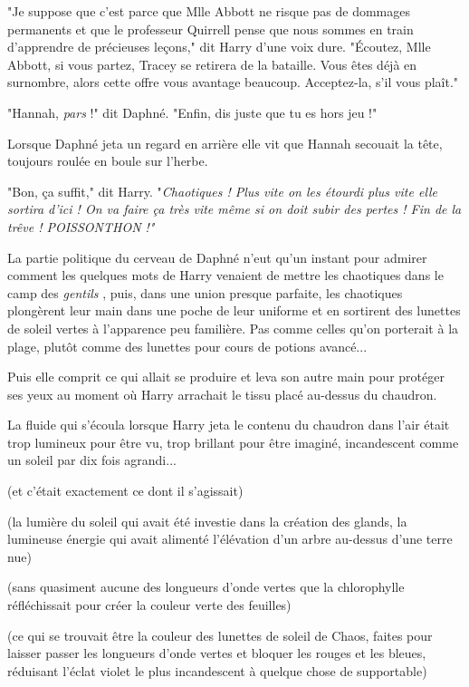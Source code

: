 "Je suppose que c'est parce que Mlle Abbott ne risque pas de dommages permanents et que le professeur Quirrell pense que nous sommes en train d'apprendre de précieuses leçons," dit Harry d'une voix dure. "Écoutez, Mlle Abbott, si vous partez, Tracey se retirera de la bataille. Vous êtes déjà en surnombre, alors cette offre vous avantage beaucoup. Acceptez-la, s'il vous plaît."

"Hannah, \emph{pars } !" dit Daphné. "Enfin, dis juste que tu es hors jeu !"

Lorsque Daphné jeta un regard en arrière elle vit que Hannah secouait la tête, toujours roulée en boule sur l'herbe.

"Bon, ça suffit," dit Harry. "\emph{Chaotiques ! Plus vite on les étourdi plus vite elle sortira d'ici ! On va faire ça très vite même si on doit subir des pertes ! Fin de la trêve ! POISSONTHON !"} 

La partie politique du cerveau de Daphné n'eut qu'un instant pour admirer comment les quelques mots de Harry venaient de mettre les chaotiques dans le camp des \emph{gentils} , puis, dans une union presque parfaite, les chaotiques plongèrent leur main dans une poche de leur uniforme et en sortirent des lunettes de soleil vertes à l'apparence peu familière. Pas comme celles qu'on porterait à la plage, plutôt comme des lunettes pour cours de potions avancé...

Puis elle comprit ce qui allait se produire et leva son autre main pour protéger ses yeux au moment où Harry arrachait le tissu placé au-dessus du chaudron.

La fluide qui s'écoula lorsque Harry jeta le contenu du chaudron dans l'air était trop lumineux pour être vu, trop brillant pour être imaginé, incandescent comme un soleil par dix fois agrandi...

(et c'était exactement ce dont il s'agissait)

(la lumière du soleil qui avait été investie dans la création des glands, la lumineuse énergie qui avait alimenté l'élévation d'un arbre au-dessus d'une terre nue)

(sans quasiment aucune des longueurs d'onde vertes que la chlorophylle réfléchissait pour créer la couleur verte des feuilles)

(ce qui se trouvait être la couleur des lunettes de soleil de Chaos, faites pour laisser passer les longueurs d'onde vertes et bloquer les rouges et les bleues, réduisant l'éclat violet le plus incandescent à quelque chose de supportable)

